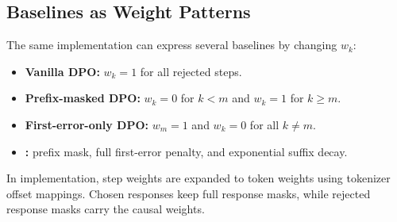 \subsection{Baselines as Weight Patterns}

The same implementation can express several baselines by changing $w_k$:
\begin{itemize}
    \item \textbf{Vanilla DPO:} $w_k=1$ for all rejected steps.
    \item \textbf{Prefix-masked DPO:} $w_k=0$ for $k<m$ and $w_k=1$ for $k \ge m$.
    \item \textbf{First-error-only DPO:} $w_m=1$ and $w_k=0$ for all $k \ne m$.
    \item \textbf{\cmdpo:} prefix mask, full first-error penalty, and exponential suffix decay.
\end{itemize}

In implementation, step weights are expanded to token weights using tokenizer offset mappings. Chosen responses keep full response masks, while rejected response masks carry the causal weights.
